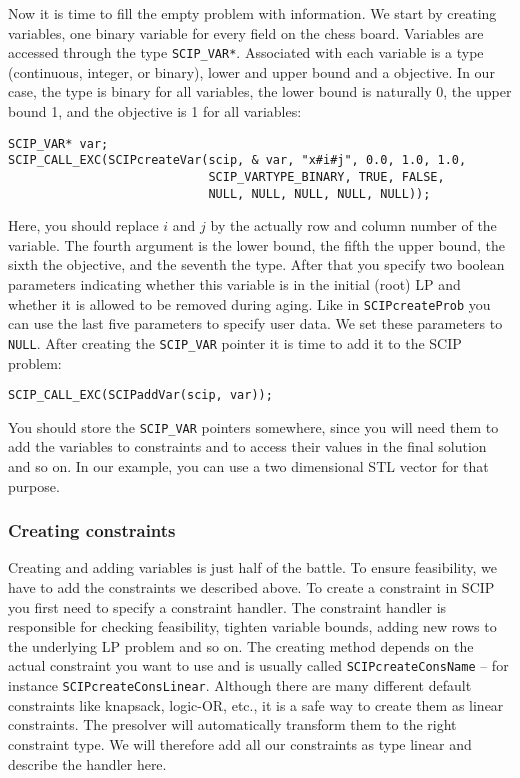 \documentclass[a4paper]{article}
\begin{document}
Now it is time to fill the empty problem with information. We start by creating variables, one binary variable for every 
field on the chess board. Variables are accessed through the type \verb+SCIP_VAR*+. Associated with each variable is a 
type (continuous, integer, or binary), lower and upper bound and a objective. In our case, the type is binary for all 
variables, the lower bound is naturally 0, the upper bound 1, and the objective is 1 for all variables:
\begin{verbatim}
SCIP_VAR* var;
SCIP_CALL_EXC(SCIPcreateVar(scip, & var, "x#i#j", 0.0, 1.0, 1.0,
                            SCIP_VARTYPE_BINARY, TRUE, FALSE,
                            NULL, NULL, NULL, NULL, NULL));
\end{verbatim}
Here, you should replace $i$ and $j$ by the actually row and column number of the variable. The fourth argument is the 
lower bound, the fifth the upper bound, the sixth the objective, and the seventh the type. After that you specify two 
boolean parameters indicating whether this variable is in the initial (root) LP and whether it is allowed to be removed 
during aging. Like in \verb+SCIPcreateProb+ you can use the last five parameters to specify user data. We set these 
parameters to \verb+NULL+. After creating the \verb+SCIP_VAR+ pointer it is time to add it to the SCIP problem:
\begin{verbatim}
SCIP_CALL_EXC(SCIPaddVar(scip, var));
\end{verbatim}
You should store the \verb+SCIP_VAR+ pointers somewhere, since you will need them to add the variables to constraints and to access their values in the final solution and so on. In our example, you can use a two dimensional STL vector for that purpose.


\subsubsection{Creating constraints}

Creating and adding variables is just half of the battle. To ensure feasibility, we have to add the constraints we described above. To create a constraint in SCIP you first need to specify a constraint handler. The constraint handler is responsible for checking feasibility, tighten variable bounds, adding new rows to the underlying LP problem and so on. The creating method depends on the actual constraint you want to use and is  usually called \verb+SCIPcreateConsName+ -- for instance \verb+SCIPcreateConsLinear+. Although there are many different default constraints like knapsack, logic-OR, etc., it is a safe way to create them as linear constraints. The presolver will automatically transform them to the right constraint type. We will therefore add all our constraints as type linear and describe the handler here.
\end{document}
